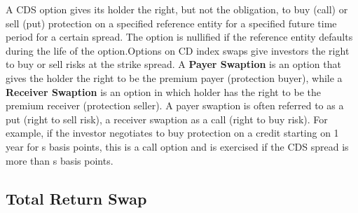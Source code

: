 \documentclass[11pt]{article}
\numberwithin{equation}{section}
\begin{document}
	   \hspace{1 cm} A CDS option gives its holder the right, but not the obligation, to buy (call) or sell (put) protection on a specified reference entity for a specified future time period for a certain spread. The option is nullified if the reference entity defaults during the life of the option.Options on CD index swaps give investors the right to buy or sell risks at the strike spread. A \textbf{Payer Swaption} is an option that gives the holder the right to be the premium payer (protection buyer), while a \textbf{Receiver Swaption} is an option in which holder has the right to be the premium receiver (protection seller). A payer swaption is often referred to as a put (right to sell risk), a receiver swaption as a call (right to buy risk). For example, if the investor negotiates to buy protection on a credit starting on 1 year for s basis points, this is a call option and is exercised if the CDS spread  is more than s basis points. 
	   
	   \subsection{Total Return Swap}
	   \medskip
	   
\end{document}
